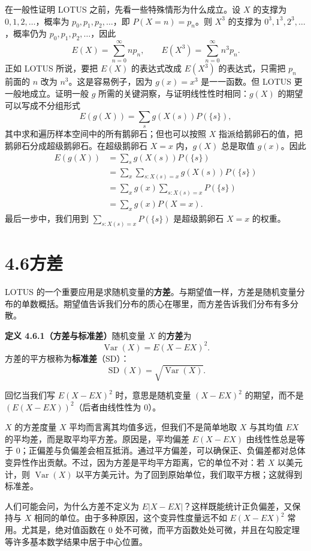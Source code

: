 \documentclass[UTF8,12pt,a4paper,fontset=fandol]{ctexart}
\begin{document}
在一般性证明 LOTUS 之前，先看一些特殊情形为什么成立。设 $X$ 的支撑为 $0,1,2,\ldots$，概率为 $p_0,p_1,p_2,\ldots$，即 $P(X=n)=p_n$。则 $X^3$ 的支撑为 $0^3,1^3,2^3,\ldots$，概率仍为 $p_0,p_1,p_2,\ldots$，因此
\[
  E(X)=\sum_{n=0}^{\infty}np_n,\qquad
  E(X^3)=\sum_{n=0}^{\infty}n^3p_n.
\]
正如 LOTUS 所说，要把 $E(X)$ 的表达式改成 $E(X^3)$ 的表达式，只需把 $p_n$ 前面的 $n$ 改为 $n^3$。这是容易例子，因为 $g(x)=x^3$ 是一一函数。但 LOTUS 更一般地成立。证明一般 $g$ 所需的关键洞察，与证明线性性时相同：$g(X)$ 的期望可以写成不分组形式
\[
  E(g(X))=\sum_s g(X(s))P(\{s\}),
\]
其中求和遍历样本空间中的所有鹅卵石；但也可以按照 $X$ 指派给鹅卵石的值，把鹅卵石分成超级鹅卵石。在超级鹅卵石 $X=x$ 内，$g(X)$ 总是取值 $g(x)$。因此
\[
\begin{aligned}
  E(g(X))
  &=\sum_s g(X(s))P(\{s\})\\
  &=\sum_x \sum_{s:X(s)=x} g(X(s))P(\{s\})\\
  &=\sum_x g(x)\sum_{s:X(s)=x}P(\{s\})\\
  &=\sum_x g(x)P(X=x).
\end{aligned}
\]
最后一步中，我们用到 $\sum_{s:X(s)=x}P(\{s\})$ 是超级鹅卵石 $X=x$ 的权重。

\section*{4.6\quad 方差}

LOTUS 的一个重要应用是求随机变量的\textbf{方差}。与期望值一样，方差是随机变量分布的单数概括。期望值告诉我们分布的质心在哪里，而方差告诉我们分布有多分散。

\noindent\textbf{定义 4.6.1（方差与标准差）}\quad 随机变量 $X$ 的\textbf{方差}为
\[
  \operatorname{Var}(X)=E(X-EX)^2.
\]
方差的平方根称为\textbf{标准差}（SD）：
\[
  \operatorname{SD}(X)=\sqrt{\operatorname{Var}(X)}.
\]

回忆当我们写 $E(X-EX)^2$ 时，意思是随机变量 $(X-EX)^2$ 的期望，而不是 $(E(X-EX))^2$（后者由线性性为 $0$）。

$X$ 的方差度量 $X$ 平均而言离其均值多远，但我们不是简单地取 $X$ 与其均值 $EX$ 的平均差，而是取平均平方差。原因是，平均偏差 $E(X-EX)$ 由线性性总是等于 $0$；正偏差与负偏差会相互抵消。通过平方偏差，可以确保正、负偏差都对总体变异性作出贡献。不过，因为方差是平均平方距离，它的单位不对：若 $X$ 以美元计，则 $\operatorname{Var}(X)$ 以平方美元计。为了回到原始单位，我们取平方根；这就得到标准差。

人们可能会问，为什么方差不定义为 $E|X-EX|$？这样既能统计正负偏差，又保持与 $X$ 相同的单位。由于多种原因，这个变异性度量远不如 $E(X-EX)^2$ 常用。尤其是，绝对值函数在 $0$ 处不可微，而平方函数处处可微，并且在勾股定理等许多基本数学结果中居于中心位置。
\end{document}
